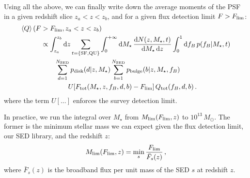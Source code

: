\documentclass[11pt,a4paper]{article}
\newcommand\mean[1]{\left< #1 \right>}
\newcommand{\msun}{M_\odot}
\newcommand{\mstar}{M_\star}
\newcommand{\dd}{\mathrm{d}}
\numberwithin{equation}{section}
\begin{document}
Using all the above, we can finally write down the average moments of the PSF in a given redshift slice $z_a < z < z_b$, and for a given flux detection limit $F > F_{\rm lim}$:
\begin{align}
\mean{Q}(F &> F_{\rm lim}, z_a < z < z_b) \nonumber \\
&\propto \int_{z_a}^{z_b}\dd z\sum_{t=\{{\rm SF,QU}\}}\int_0^{+\infty} \dd \mstar\,\frac{\dd N(z, \mstar, t)}{\dd \mstar\, \dd z} \int_0^1\dd f_B\,p(f_B | \mstar,t) \nonumber \\
&\quad\quad \sum_{d=1}^{N_{\rm SED}} p_{\rm disk}(d | z,\mstar) \sum_{b=1}^{N_{\rm SED}}p_{\rm bulge}(b | z,\mstar,f_B) \nonumber \\
&\quad\quad\quad\quad U[F_{\rm tot}(\mstar, z, f_B, d, b) - F_{\rm lim}]\,Q_{\rm tot}(f_B, d, b)\,.
\end{align}
where the term $U[...]$ enforces the survey detection limit.

In practice, we run the integral over $\mstar$ from $M_{\rm lim}(F_{\rm lim},z)$ to $10^{13}\,\msun$. The former is the minimum stellar mass we can expect given the flux detection limit, our SED library, and the redshift $z$:
\begin{align}
M_{\rm lim}(F_{\rm lim},z) = \min_{s} \frac{F_{\rm lim}}{\bar{F}_s(z)}\,,
\end{align}
where $\bar{F}_s(z)$ is the broadband flux per unit mass of the SED $s$ at redshift $z$.
\end{document}
